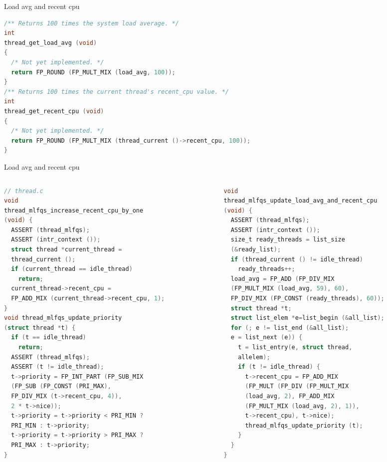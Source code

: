 \documentclass{beamer}
\begin{document}
\begin{frame}[fragile]{Load avg and recent cpu}
\begin{lstlisting}[language=C]
/** Returns 100 times the system load average. */
int
thread_get_load_avg (void) 
{
  /* Not yet implemented. */
  return FP_ROUND (FP_MULT_MIX (load_avg, 100));
}
/** Returns 100 times the current thread's recent_cpu value. */
int
thread_get_recent_cpu (void) 
{
  /* Not yet implemented. */
  return FP_ROUND (FP_MULT_MIX (thread_current ()->recent_cpu, 100));
}
\end{lstlisting}
\end{frame}
\begin{frame}[fragile]{Load avg and recent cpu}
\begin{columns}
\begin{column}{0.5\textwidth}
\begin{lstlisting}[language=C]
// thread.c
void
thread_mlfqs_increase_recent_cpu_by_one 
(void) {
  ASSERT (thread_mlfqs);
  ASSERT (intr_context ());
  struct thread *current_thread =
  thread_current ();
  if (current_thread == idle_thread)
    return;
  current_thread->recent_cpu = 
  FP_ADD_MIX (current_thread->recent_cpu, 1);
}
void thread_mlfqs_update_priority 
(struct thread *t) {
  if (t == idle_thread)
    return;
  ASSERT (thread_mlfqs);
  ASSERT (t != idle_thread);
  t->priority = FP_INT_PART (FP_SUB_MIX 
  (FP_SUB (FP_CONST (PRI_MAX), 
  FP_DIV_MIX (t->recent_cpu, 4)), 
  2 * t->nice));
  t->priority = t->priority < PRI_MIN ?
  PRI_MIN : t->priority;
  t->priority = t->priority > PRI_MAX ?
  PRI_MAX : t->priority;
}
\end{lstlisting}
\end{column}
\begin{column}{0.5\textwidth}
\begin{lstlisting}[language=C]
void
thread_mlfqs_update_load_avg_and_recent_cpu
(void) {
  ASSERT (thread_mlfqs);
  ASSERT (intr_context ());
  size_t ready_threads = list_size 
  (&ready_list);
  if (thread_current () != idle_thread)
    ready_threads++;
  load_avg = FP_ADD (FP_DIV_MIX 
  (FP_MULT_MIX (load_avg, 59), 60), 
  FP_DIV_MIX (FP_CONST (ready_threads), 60));
  struct thread *t;
  struct list_elem *e=list_begin (&all_list);
  for (; e != list_end (&all_list); 
  e = list_next (e)) {
    t = list_entry(e, struct thread, 
    allelem);
    if (t != idle_thread) {
      t->recent_cpu = FP_ADD_MIX 
      (FP_MULT (FP_DIV (FP_MULT_MIX
      (load_avg, 2), FP_ADD_MIX 
      (FP_MULT_MIX (load_avg, 2), 1)), 
      t->recent_cpu), t->nice);
      thread_mlfqs_update_priority (t);
    }
  }
}
\end{lstlisting}
\end{column}
\end{columns}
\end{frame}
\end{document}
